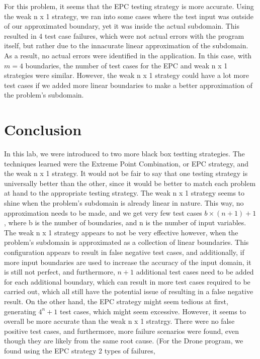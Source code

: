 \documentclass[letterpaper]{article}
\begin{document}
For this problem, it seems that the EPC testing strategy is more accurate.
Using the weak n x 1 strategy, we ran into some cases where the test input
was outside of our approximated boundary, yet it was inside the actual
subdomain. This resulted in 4 test case failures, which were not actual
errors with the program itself, but rather due to the innacurate linear
approximation of the subdomain. As a result, no actual errors were identified 
in the application. In this case, with $m=4$ boundaries, the number of test
cases for the EPC and weak n x 1 strategies were similar. However, 
the weak n x 1 strategy could have a lot more test cases if we added more 
linear boundaries to make a better approximation of the problem's subdomain.

\section{Conclusion}
In this lab, we were introduced to two more black box testting strategies. The
techniques learned were the Extreme Point Combination, or EPC strategy, and the
weak n x 1 strategy. It would not be fair to say that one testing strategy
is universally better than the other, since it would be better to match
each problem at hand to the appropriate testing strategy. The weak n x 1
strategy seems to shine when the problem's subdomain is already linear in
nature. This way, no approximation needs to be made, and we get very few
test cases $b \times (n + 1) + 1$, where b is the number of boundaries, and
n is the number of input variables. The weak n x 1 strategy appears to not
be very effective however, when the problem's subdomain is approximated as
a collection of linear boundaries. This configuration appears to result in
false negative test cases, and additionally, if more input boundaries are
used to increase the accuracy of the input domain, it is still not perfect,
and furthermore, $n + 1$ additional test cases need to be added for each
additional boundary, which can result in more test cases required to be carried
out, which all still have the potential issue of resulting in a false
negative result. On the other hand, the EPC strategy might seem tedious
at first, generating $4^n + 1$ test cases, which might seem excessive.
However, it seems to overall be more accurate than the weak n x 1 stratrgy.
There were no false positive test cases, and furthermore, more failure
scenarios were found, even though they are likely from the same root cause.
(For the Drone program, we found using the EPC strategy 2 types of failures,
\end{document}
